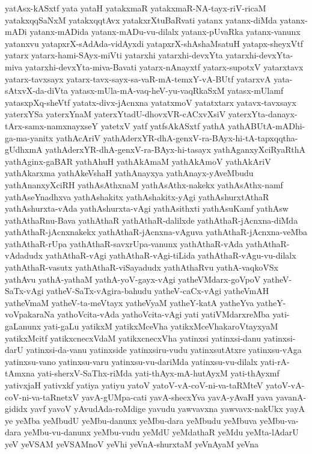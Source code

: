 {yatAsx-kASxtf
yata
yataH
yatakxmaR
yatakxmaR-NA-tayx-riV-ricaM
yatakxqqSaNxM
yatakxqqtAvx
yatakxrXtuBaRvati
yatanx
yatanx-diMda
yatanx-mADi
yatanx-mADida
yatanx-mADu-vu-dilalx
yatanx-pUvaRka
yatanx-vanunx
yatanxvu
yatapxrX-sAdAda-vidAyxdi
yatapxrX-shAshaMsatuH
yatapx-sheyxVtf
yatarx
yatarx-hami-SAyx-miVti
yatarxhi
yatarxhi-devxYta
yatarxhi-devxYta-miva
yatarxhi-devxYta-miva-Bavati
yatarx-nAnayxtf
yatarx-supotxV
yatarxtavx
yatarx-tavxsayx
yatarx-tavx-sayx-sa-vaR-mA-temxY-vA-BUtf
yatarxvA
yata-sAtxvX-da-diVta
yatasx-mUla-mA-vaq-heV-yu-vaqRkaSxM
yatasx-mUlamf
yatasxpXq-sheVtf
yatatx-divx-jAcnxna
yatatxmoV
yatatxtarx
yatavx-tavxsayx
yaterxYSa
yaterxYnaM
yaterxYtadU-dhovxVR-cACxvXsiV
yaterxYta-danayx-tArx-samx-namxnayxseY
yatetxV
yatf
yatfsAkASxtf
yathA
yathABUtA-mADhi-ga-ma-yanitx
yathAcAriV
yathAderxYR-dhA-genxV-ra-BAyx-hi-tA-tapxqqtha-gUdhxmA
yathAderxYR-dhA-genxV-ra-BAyx-hi-tasayx
yathAganxyXciRyaRthA
yathAginx-gaBAR
yathAhuH
yathAkAmaM
yathAkAmoV
yathAkAriV
yathAkarxma
yathAkeVshaH
yathAnayxya
yathAnayx-yAveMbudu
yathAnanxyXciRH
yathAsAthxnaM
yathAsAthx-nakekx
yathAsAthx-namf
yathAseYnadhxva
yathAshakitx
yathAshakitx-yAgi
yathAshurxtAthaR
yathAshurxta-vAda
yathAshurxta-vAgi
yathAsithxti
yathAsuKamf
yathAsw
yathAthaRnu-Bava
yathAthaR
yathAthaR-dalilxde
yathAthaR-jAcnxna-diMda
yathAthaR-jAcnxnakekx
yathAthaR-jAcnxna-vAguva
yathAthaR-jAcnxna-veMba
yathAthaR-rUpa
yathAthaR-savxrUpa-vanunx
yathAthaR-vAda
yathAthaR-vAdadudx
yathAthaR-vAgi
yathAthaR-vAgi-tiLida
yathAthaR-vAgu-vu-dilalx
yathAthaR-vasutx
yathAthaR-viSayadudx
yathAthaRvu
yathA-vaqkoVSx
yathAvu
yathA-yathaM
yathA-yoV-gayx-vAgi
yatheVMdarx-goVpoV
yatheV-SaTx-vAgi
yatheV-SaTx-vAgira-bahudu
yatheV-caCx-vAgi
yatheVmAH
yatheVmaM
yatheV-ta-meVtayx
yatheVyaM
yatheY-katA
yatheYva
yatheY-voVpakaraNa
yathoVcita-vAda
yathoVcita-vAgi
yati
yatiVMdarxreMba
yati-gaLanunx
yati-gaLu
yatikxM
yatikxMceVha
yatikxMceVhakaroVtayxyaM
yatikxMcitf
yatikxcnecxVdaM
yatikxcnecxVha
yatinxsi
yatinxsi-danu
yatinxsi-darU
yatinxsi-da-vanu
yatinxside
yatinxsiru-vudu
yatinxsutAtxre
yatinxsu-vAga
yatinxsu-vano
yatinxsu-varu
yatinxsu-vu-dariMda
yatinxsu-vu-dilalx
yati-rA-tAmxna
yati-sherxV-SaThx-riMda
yati-thAyx-mA-hutAyxM
yati-thAyxmf
yativxjaH
yativxkf
yatiya
yatiyu
yatoV
yatoV-vA-coV-ni-va-taRMteV
yatoV-vA-coV-ni-va-taRnetxV
yavA-gUMpa-cati
yavA-shecxYva
yavA-yAvaH
yava
yavanA-gididx
yavf
yavoV
yAvudAda-roMdige
yavudu
yawvavxna
yawvavx-nakUkx
yayA
ye
yeMba
yeMbudU
yeMbu-danunx
yeMbu-dara
yeMbudu
yeMbuva
yeMbu-va-dara
yeMbu-vu-danunx
yeMbu-vudu
yeMdU
yeMdathaR
yeMdu
yeMta-lAdarU
yeV
yeVSAM
yeVSAMnoV
yeVhi
yeVnA-shurxtaM
yeVnAyaM
yeVna
}
